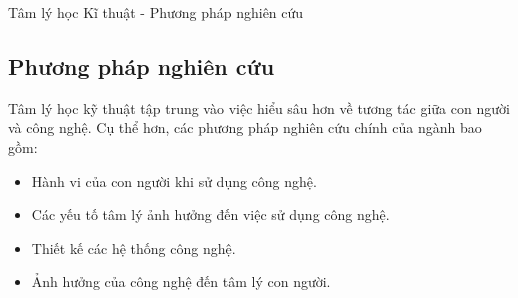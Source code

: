 \documentclass[../main.tex]{subfiles}
\begin{document}
\begin{frame}{Tâm lý học Kĩ thuật - Phương pháp nghiên cứu}
\subsection{Phương pháp nghiên cứu}
Tâm lý học kỹ thuật tập trung vào việc hiểu sâu hơn về tương tác giữa con người và công nghệ. Cụ thể hơn, các phương pháp nghiên cứu chính của ngành bao gồm:
\begin{itemize}
    \item Hành vi của con người khi sử dụng công nghệ.
    \item Các yếu tố tâm lý ảnh hưởng đến việc sử dụng công nghệ.
    \item Thiết kế các hệ thống công nghệ.
    \item Ảnh hưởng của công nghệ đến tâm lý con người.

\end{itemize}

\end{frame}
\end{document}
